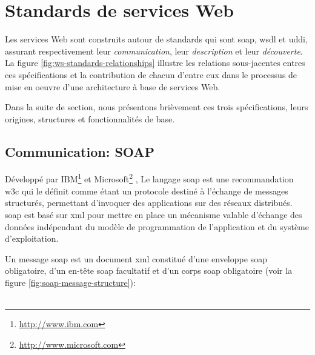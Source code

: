\newpage
\section{Standards de services Web}
\label{sec:reference-arch}
Les services Web sont construits autour de standards qui sont
\acrshort{soap}, \acrshort{wsdl} et \acrshort{uddi}, assurant
respectivement leur \emph{communication}, leur \emph{description} et
leur \emph{découverte}. La figure \ref{fig:ws-standards-relationships}
illustre les relations sous-jacentes entres ces spécifications et la
contribution de chacun d'entre eux dans le processus de mise en oeuvre
d'une architecture à base de services Web.



Dans la suite de section, nous présentons brièvement ces trois
spécifications, leurs origines, structures et fonctionnalités de base.

  \subsection{Communication: SOAP}
  \label{sec:soap}
  Développé par IBM\footnote{\url{http://www.ibm.com}} et
  Microsoft\footnote{\url{http://www.microsoft.com}}
  \cite{box2000simple}, Le langage \acrshort{soap} est une
  recommandation \acrshort{w3c} \cite{mitra2003soap} qui le définit
  comme étant un protocole destiné à l'échange de messages structurés,
  permettant d'invoquer des applications sur des réseaux
  distribués. \acrshort{soap} est basé sur \acrshort{xml} pour mettre
  en place un mécanisme valable d'échange des données indépendant du
  modèle de programmation de l'application et du système
  d'exploitation.

  Un message \acrshort{soap} est un document \acrshort{xml} constitué
  d'une enveloppe \acrshort{soap} obligatoire, d'un en-tête
  \acrshort{soap} facultatif et d'un corps \acrshort{soap} obligatoire
  (voir la figure \ref{fig:soap-message-structure}):\\\\

  

